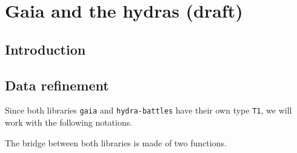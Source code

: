 \chapter{Gaia and the hydras (draft)}

\section{Introduction}


\section{Data refinement}

Since both libraries \texttt{gaia} and \texttt{hydra-battles} have their own type \texttt{T1}, we will work with the following notations.


The bridge between both libraries is made of two functions.






